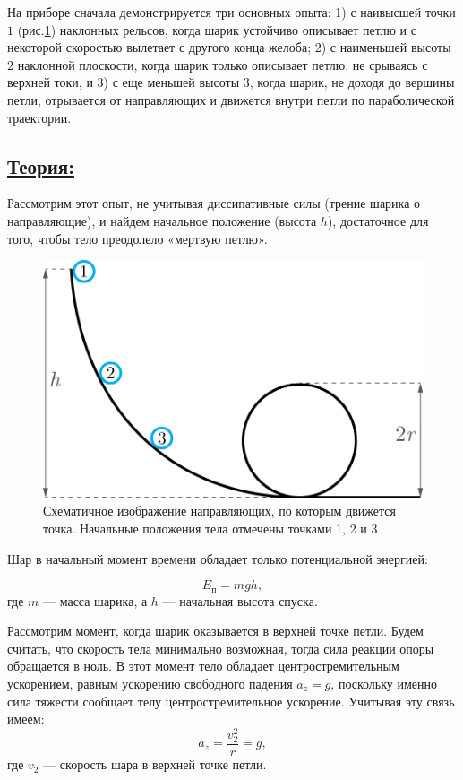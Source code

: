 \documentclass[14pt,a4paper,oneside]{extarticle}	%
\begin{document}
На приборе сначала демонстрируется три основных опыта: 1) с наивысшей точки $ 1 $ (рис.\ref{loop-2}) наклонных рельсов, когда шарик устойчиво описывает петлю и с некоторой скоростью вылетает с другого конца желоба; 2) с наименьшей высоты $ 2 $ наклонной плоскости, когда шарик только описывает петлю, не срываясь с верхней токи, и 3) с еще меньшей высоты $ 3 $, когда шарик, не доходя до вершины петли, отрывается от направляющих и движется внутри петли по параболической траектории.

\subsection*{\underline{Теория:}}

Рассмотрим этот опыт, не учитывая диссипативные силы (трение шарика о направляющие), и найдем начальное положение (высота $ h $), достаточное для того, чтобы тело преодолело «мертвую петлю».  

\begin{figure}[H] 
	\centering 	
	\includegraphics[width=0.5\linewidth]{loop-2.png}
	\caption{Схематичное изображение направляющих, по которым движется точка. Начальные положения тела отмечены точками 1, 2 и 3}
	\label{loop-2}
\end{figure}

Шар в начальный момент времени обладает только потенциальной энергией:
  
\begin{equation}\label{loop-eq1}
E_{\text{п}} = mgh,
\end{equation}
 где $ m $ — масса шарика, а $ h $ — начальная высота спуска.
 
Рассмотрим момент, когда шарик оказывается в верхней точке петли. Будем считать, что скорость тела минимально возможная, тогда сила реакции опоры обращается в ноль.
В этот момент тело обладает центростремительным ускорением, равным ускорению свободного падения $ a_{z} = g $, поскольку именно сила тяжести сообщает телу центростремительное ускорение.
Учитывая эту связь имеем:  
\begin{equation}\label{loop-eq5}
a_{z} = \frac{v^{2}_{2}}{r} = g,
\end{equation}
где $ v_2 $ — скорость шара в верхней точке петли.
\end{document}
